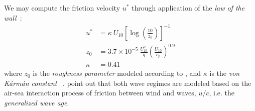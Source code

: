 We may compute the friction velocity
$u^{\ast}$ through application of the \emph{law of the wall}~\cite{article:vonKarman1931}:
%
\begin{subequations}
\begin{align}
u^{\ast} &= \kappa~U_{10} \left[\log\left(\frac{10}{z_0}\right)\right]^{-1}\\
z_0 &= 3.7 \times 10^{-5}~\frac{U_{10}^2}{g}
\left(\frac{U_{10}}{c_p}\right)^{0.9} \label{eq:z_0}\\
\kappa &= 0.41
\end{align}
\end{subequations}
%
where $z_0$ is the \emph{roughness parameter} modeled according to
\cite{article:Donelan1993}, and $\kappa$ is the \emph{von K\'arm\'an constant}
~\citep{article:vonKarman1931}. \citeauthor{article:Elfouhaily1997}
point out that both wave regimes
are modeled based on the air-sea interaction process of friction between wind and
waves, $u/c$, i.e. the \emph{generalized wave age}.
%
%
